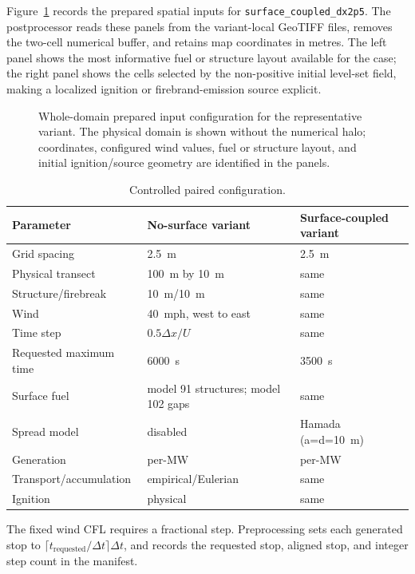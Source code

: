 Figure~\ref{fig:input-configuration} records the prepared spatial inputs for \texttt{surface\_coupled\_dx2p5}.
The postprocessor reads these panels from the variant-local GeoTIFF files, removes the
two-cell numerical buffer, and retains map coordinates in metres.  The left panel shows
the most informative fuel or structure layout available for the case; the right panel
shows the cells selected by the non-positive initial level-set field, making a localized
ignition or firebrand-emission source explicit.

\begin{figure}[H]
\centering
{}
\caption{Whole-domain prepared input configuration for the representative variant.  The
physical domain is shown without the numerical halo; coordinates, configured wind values,
fuel or structure layout, and initial ignition/source geometry are identified in the panels.}
\label{fig:input-configuration}
\end{figure}


\begin{table}[H]
\centering\small
\caption{Controlled paired configuration.}
\begin{tabular}{lll}
\toprule
Parameter & No-surface variant & Surface-coupled variant\\
\midrule
Grid spacing & \SI{2.5}{m} & \SI{2.5}{m}\\
Physical transect & \SI{100}{m} by \SI{10}{m} & same\\
Structure/firebreak & \SI{10}{m}/\SI{10}{m} & same\\
Wind & \SI{40}{mph}, west to east & same\\
Time step & \(0.5\Delta x/U\) & same\\
Requested maximum time & \SI{6000}{s} & \SI{3500}{s}\\
Surface fuel & model 91 structures; model 102 gaps & same\\
Spread model & disabled & Hamada (a=d=\SI{10}{m})\\
Generation & per-MW & per-MW\\
Transport/accumulation & empirical/Eulerian & same\\
Ignition & physical & same\\
\bottomrule
\end{tabular}
\end{table}

The fixed wind CFL requires a fractional step. Preprocessing sets each generated
stop to \(\lceil t_{\mathrm{requested}}/\Delta t\rceil\Delta t\), and records
the requested stop, aligned stop, and integer step count in the manifest.

